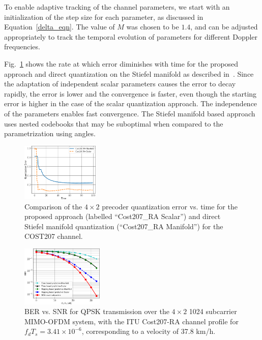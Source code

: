 \documentclass[journal,10pt,twocolumn]{IEEEtran}
\begin{document}
To enable adaptive tracking of the channel parameters, we start with
an initialization of the step size for each parameter, as discussed in
Equation~\ref{delta_eqn}. The value of $M$ was chosen to be $1.4$, and
can be adjusted appropriately to track the temporal evolution of
parameters for different Doppler frequencies.

Fig.~\ref{fig:error_decay} shows the rate at which error diminishes
with time for the proposed approach and direct quantization on the
Stiefel manifold as described in~\cite{Gupt1905:Predictive}. Since the
adaptation of independent scalar parameters causes the error to decay
rapidly, the error is lower and the convergence is faster, even though
the starting error is higher in the case of the scalar quantization
approach. The independence of the parameters enables fast
convergence. The Stiefel manifold based approach uses nested codebooks
that may be suboptimal when compared to the parametrization using
angles.

\begin{figure}
\begin{center}
\includegraphics[width=0.33\textwidth]{images/qerror.pdf}
\caption{\label{fig:error_decay}Comparison of the $4\times 2$
  precoder quantization error vs. time for the proposed
  approach (labelled ``Cost207\_RA Scalar'') and direct Stiefel
  manifold quantization (``Cost207\_RA Manifold'') for the COST207 channel.}
\end{center}
\end{figure}

\begin{figure}
\begin{center}
\includegraphics[width=0.35\textwidth]{images/1024final_withtime}
\caption{BER vs. SNR for QPSK transmission over the $4\times 2$ 1024
  subcarrier MIMO-OFDM system, with the ITU Cost207-RA channel profile
  for $f_dT_s = 3.41\times 10^{-6}$, corresponding to a velocity of 37.8 km/h.}
\label{fig:ber_ped}
\end{center}
\end{figure}
\end{document}
